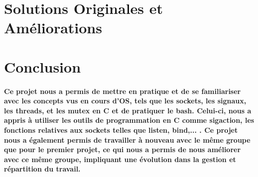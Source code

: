 \documentclass[utf8]{article}
\begin{document}
\paragraph{}

\section{Solutions Originales et Améliorations}
\paragraph{}

\section{Conclusion}
\paragraph{Ce projet nous a permis de mettre en pratique et de se familiariser avec les concepts vus en cours d'OS,
tels que les sockets, les signaux, les threads, et les mutex en C et de pratiquer le bash.
Celui-ci, nous a appris à utiliser les outils de programmation en C comme sigaction, les fonctions relatives aux sockets telles que listen, bind,... .
Ce projet nous a également permis de travailler à nouveau avec le même groupe que pour le premier projet, ce qui nous a permis de nous 
améliorer avec ce même groupe, impliquant une évolution dans la gestion et répartition du travail.}
\end{document}
